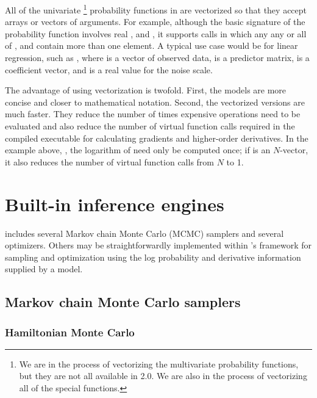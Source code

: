 \documentclass[article]{jss}
\begin{document}
All of the univariate%
%
\footnote{We are in the process of vectorizing the multivariate
  probability functions, but they are not all available in
   2.0.  We are also in the process of vectorizing
  all of the special functions.}
%
probability functions in  are vectorized so that they
accept arrays or vectors of arguments.  For example, although the
basic signature of the probability function
 involves real ,  and
, it supports calls in which any any or all of ,
 and  contain more than one element. A typical
use case would be for linear regression, such as , where  is a vector of observed data,
 is a predictor matrix,  is a coefficient vector,
and  is a real value for the noise scale.

The advantage of using vectorization is twofold.  First, the models
are more concise and closer to mathematical notation.  Second, the
vectorized versions are much faster.  They reduce the number of times
expensive operations need to be evaluated and also reduce the number
of virtual function calls required in the compiled 
executable for calculating gradients and higher-order derivatives.
In the example above, , the logarithm of  need only be computed
once; if  is an $N$-vector, it also reduces the number of
virtual function calls from $N$ to 1.

\section{Built-in inference engines}\label{inference-engines.section}

 includes several Markov chain Monte Carlo (MCMC)
samplers and several optimizers.  Others may be straightforwardly
implemented within 's  framework for
sampling and optimization using the log probability and derivative
information supplied by a model.

\subsection{Markov chain Monte Carlo samplers}

\subsubsection{Hamiltonian Monte Carlo}
\end{document}
